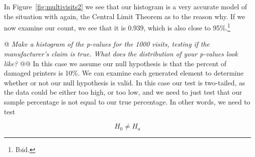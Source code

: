 \documentclass[10pt]{report}\usepackage[]{graphicx}\usepackage[]{xcolor}
\begin{document}
\begin{easylist}[enumerate]
        In Figure~\ref{fig:multivisits2} we see that our histogram is a very accurate model of the situation with
        again, the Central Limit Theorem as to the reason why. If we now examine our count, we see that it is
        $0.939$, which is also close to 95\%.\footnote{Ibid.}

        \newpage
        @ \textit{Make a histogram of the p-values for the 1000 visits, testing if the manufacturer's claim is true.
        What does the distribution of your p-values look like?}
        @@ In this case we assume our null hypothesis is that the percent of damaged printers is 10\%. We can examine
        each generated element to determine whether or not our null hypothesis is valid. In this case our test is
        two-tailed, as the data could be either too high, or too low, and we need to just test that our sample
        percentage is not equal to our true percentage. In other words, we need to test

        \[
            H_0 \neq H_a
        \]


\end{easylist}
\end{document}
